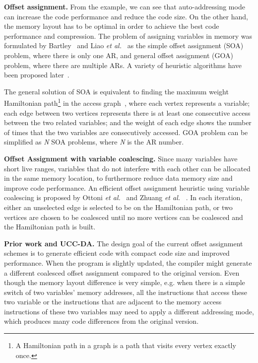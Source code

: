 \textbf{Offset assignment.}
From the example, we can see that auto-addressing mode can increase the code performance and reduce the code size. On 
the other hand, the memory layout has to be optimal in order to achieve the best code performance and compression. The 
problem of assigning variables in memory was formulated by Bartley~\cite{related:bartley} and Liao \textit{et 
al.}~\cite{related:liao} as the simple offset assignment (SOA) problem, where there is only one AR, and general offset 
assignment (GOA) problem, where there are multiple ARs. A variety of heuristic algorithms have been proposed 
later~\cite{related:atri,related:choi,related:leupers-1996,related:leupers-1998,related:ottoni,related:rao,related:sudar
sanam,related:zhuang}.

The general solution of SOA is equivalent to finding the maximum weight Hamiltonian path\footnote{A Hamiltonian path in 
a graph is a path that visits every vertex exactly once.} in the access graph~\cite{related:bartley, related:liao}, 
where each vertex represents a variable; each edge between two vertices represents there is at least one consecutive 
access between the two related variables; and the weight of each edge shows the number of times that the two variables 
are consecutively accessed. GOA problem can be simplified as \textit{N} SOA problems, where \textit{N} is the AR 
number. 

\textbf{Offset Assignment with variable coalescing.}
Since many variables have short live ranges, variables that do not interfere with each other can be allocated in the 
same memory location, to furthermore reduce data memory size and improve code performance. An efficient offset 
assignment heuristic using variable coalescing is proposed by Ottoni \textit{et al.}~\cite{related:ottoni} and Zhuang 
\textit{et al.} ~\cite{related:zhuang}. In each iteration, either an unselected edge is selected to be on the 
Hamiltonian path, or two vertices are chosen to be coalesced until no more vertices can be coalesced and the 
Hamiltonian path is built.

\textbf{Prior work and UCC-DA.}
The design goal of the current offset assignment schemes is to generate efficient code with compact code size and 
improved performance.  When the program is slightly updated, the compiler might generate a different coalesced offset 
assignment compared to the original version. Even though the memory layout difference is very simple, e.g. when there 
is a simple switch of two variables' memory addresses, all the instructions that access these two variable or the 
instructions that are adjacent to the memory access instructions of these two variables may need to apply a different 
addressing mode, which produces many code differences from the original version. 

